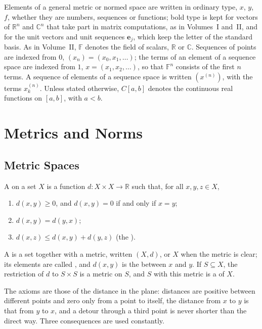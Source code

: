Elements of a general metric or normed space are written in ordinary type, $x$, $y$, $f$, whether they are numbers, sequences or functions; bold type is kept for vectors of $\mathbb R^n$ and $\mathbb C^n$ that take part in matrix computations, as in Volumes~I and~II, and for the unit vectors and unit sequences $\mathbf e_j$, which keep the letter of the standard basis. As in Volume~II, $\mathbb F$ denotes the field of scalars, $\mathbb R$ or $\mathbb C$. Sequences of points are indexed from $0$, $(x_n)=(x_0,x_1,\ldots)$; the terms of an element of a sequence space are indexed from $1$, $x=(x_1,x_2,\ldots)$, so that $\mathbb F^n$ consists of the first $n$ terms. A sequence of elements of a sequence space is written $(x^{(n)})$, with the terms $x^{(n)}_k$. Unless stated otherwise, $C[a,b]$ denotes the continuous real functions on $[a,b]$, with $a<b$.

\section{Metrics and Norms}
\label{sec:metrics-norms}

\subsection{Metric Spaces}

\begin{definition}
\label{def:metric}
A  on a set $X$ is a function $d\colon X\times X\to\mathbb R$ such that, for all $x,y,z\in X$,
\begin{enumerate}
\item $d(x,y)\ge0$, and $d(x,y)=0$ if and only if $x=y$;
\item $d(x,y)=d(y,x)$;
\item $d(x,z)\le d(x,y)+d(y,z)$ (the ).
\end{enumerate}
A  is a set together with a metric, written $(X,d)$, or $X$ when the metric is clear; its elements are called , and $d(x,y)$ is the  between $x$ and $y$. If $S\subseteq X$, the restriction of $d$ to $S\times S$ is a metric on $S$, and $S$ with this metric is a  of $X$.
\end{definition}

The axioms are those of the distance in the plane: distances are positive between different points and zero only from a point to itself, the distance from $x$ to $y$ is that from $y$ to $x$, and a detour through a third point is never shorter than the direct way. Three consequences are used constantly.

